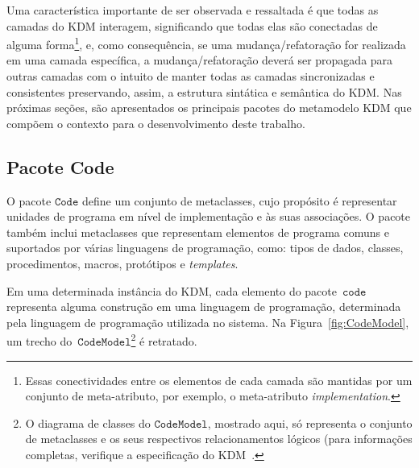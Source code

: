 Uma característica importante de ser observada e ressaltada é que todas as camadas do KDM interagem, significando que todas elas são conectadas de alguma forma\footnote{Essas conectividades entre os elementos de cada camada são mantidas por um conjunto de meta-atributo, por exemplo, o meta-atributo \textit{implementation}.}, e, como consequência, se uma mudança/refatoração for realizada em uma camada específica, a mudança/refatoração deverá ser propagada para outras camadas com o intuito de manter todas as camadas sincronizadas e consistentes preservando, assim, a estrutura sintática e semântica do KDM. Nas próximas seções, são apresentados os principais pacotes do metamodelo KDM que compõem o contexto para o desenvolvimento deste trabalho.

\subsection{Pacote Code}\label{subsection:codePackage}

O pacote $\mathtt{Code}$ define um conjunto de metaclasses, cujo propósito é representar unidades de programa em nível de implementação e às suas associações. O pacote também inclui metaclasses que representam elementos de programa comuns e suportados por várias linguagens de programação, como: tipos de dados, classes, procedimentos, macros, protótipos e \textit{templates}.


Em uma determinada instância do KDM, cada elemento do pacote~$\mathtt{code}$ representa alguma construção em uma linguagem de programação, determinada pela linguagem de programação utilizada no sistema. Na Figura~\ref{fig:CodeModel}, um trecho do~$\mathtt{CodeModel}$\footnote{O diagrama de classes do $\mathtt{CodeModel}$, mostrado aqui, só representa o conjunto de metaclasses e os seus respectivos relacionamentos lógicos (para informações completas, verifique a especificação do KDM~\cite{KDM:specification}.} é retratado.


